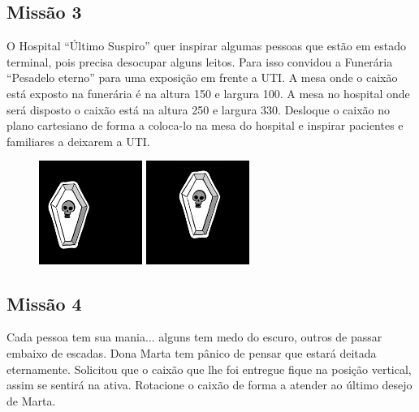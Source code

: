 \documentclass[
	12pt,				%
	oneside,			%
	a4paper,			%
	english,			%
	french,				%
	spanish,			%
	brazil,				%
	]{abntex2}
\begin{document}
\begin{apendicesenv}
\subsection{Missão 3}

O Hospital “Último Suspiro” quer inspirar algumas pessoas que estão em estado terminal, pois precisa desocupar alguns leitos. Para isso convidou a Funerária “Pesadelo eterno” para uma exposição em frente a UTI. A mesa onde o caixão está exposto na funerária é na altura 150 e largura 100. A mesa no hospital onde será disposto o caixão está na altura 250 e largura 330. Desloque o caixão no plano cartesiano de forma a coloca-lo na mesa do hospital e inspirar pacientes e familiares a deixarem a UTI.

\begin{figure}[ht]
\centering
\includegraphics[width=0.3\textwidth]{imagens/desafios/coffin2d00.jpg}
\includegraphics[width=0.3\textwidth]{imagens/desafios/mission3.png}
\end{figure}

\subsection{Missão 4}

Cada pessoa tem sua mania... alguns tem medo do escuro, outros de passar embaixo de escadas. Dona Marta tem pânico de pensar que estará deitada eternamente. Solicitou que o caixão que lhe foi entregue fique na posição vertical, assim se sentirá na ativa. Rotacione o caixão de forma a atender ao último desejo de Marta.


\end{apendicesenv}
\end{document}
